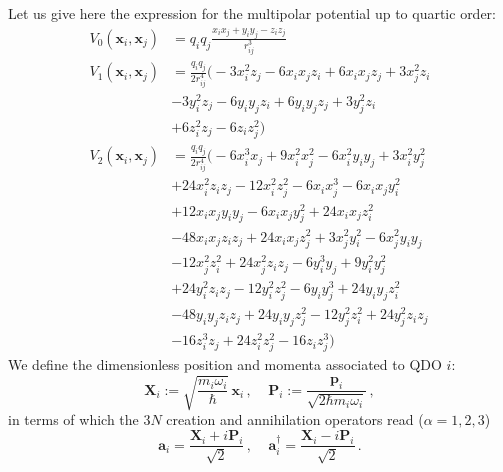 \documentclass[reprint, amsmath, amssymb, aps]{revtex4-2}
\begin{document}
        Let us give here the expression for the multipolar potential up to quartic order:
        \begin{align}
            V_0(\bm{x} _i, \bm{x} _j) &= q_iq_j\frac{x_ix_j + y_iy_j - z_iz_j}{r_{ij}^3}\\
            V_1(\bm{x} _i, \bm{x} _j) &= \frac{q_iq_j}{2r_{ij}^4}\big(-3  x_i ^2  z_j -6  x_i   x_j   z_i +6  x_i   x_j   z_j +3  x_j ^2  z_i\nonumber\\
            & -3  y_i ^2  z_j -6  y_i   y_j   z_i +6  y_i   y_j   z_j +3  y_j ^2  z_i\nonumber\\
            & +6  z_i ^2  z_j -6  z_i   z_j ^2\big)\\
            V_2(\bm{x} _i, \bm{x} _j) &= \frac{q_iq_j}{2 r_{ij}^4}\big(-6  x_i ^3  x_j +9  x_i ^2  x_j ^2-6  x_i ^2  y_i   y_j +3  x_i ^2  y_j ^2\nonumber\\
            &+24  x_i ^2  z_i   z_j -12  x_i ^2  z_j ^2-6  x_i   x_j ^3-6  x_i   x_j   y_i ^2\nonumber\\
            &+12  x_i   x_j   y_i   y_j -6  x_i   x_j   y_j ^2+24  x_i   x_j   z_i ^2\nonumber\\
            &-48  x_i   x_j   z_i   z_j +24  x_i   x_j   z_j ^2+3  x_j ^2  y_i ^2-6  x_j ^2  y_i   y_j \nonumber\\
            &-12  x_j ^2  z_i ^2+24  x_j ^2  z_i   z_j -6  y_i ^3  y_j +9  y_i ^2  y_j ^2\nonumber\\
            &+24  y_i ^2  z_i   z_j -12  y_i ^2  z_j ^2-6  y_i   y_j ^3+24  y_i   y_j   z_i ^2\nonumber\\
            &-48  y_i   y_j   z_i   z_j +24  y_i   y_j   z_j ^2-12  y_j ^2  z_i ^2+24  y_j ^2  z_i   z_j \nonumber\\
            &-16  z_i ^3  z_j +24  z_i ^2  z_j ^2-16  z_i   z_j ^3\big)
        \end{align}
        We define the dimensionless position and momenta associated to QDO $i$:
        \begin{equation}
            \bm{X}_i := \sqrt{\frac{m_i\omega_i}{\hbar}}\,\bm{x}_i\,,\ \ \ \ \ \bm{P}_i := \frac{\bm{p}_i}{\sqrt{2\hbar m_i\omega_i}}\,,
        \end{equation}
        in terms of which the $3N$ creation and annihilation operators read ($\alpha=1,2,3$)
        \begin{equation}
            \bm a_{i} = \frac{\bm X_{i} + i\bm P_{i}}{\sqrt 2}\,,\ \ \ \ \ \bm a^\dagger_{i} = \frac{\bm X_{i} - i\bm P_{i}}{\sqrt 2}\,.
        \end{equation}
\end{document}
